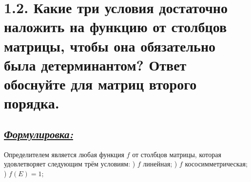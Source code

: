 \documentclass{article}
\begin{document}
\section*{\LARGE 1.2. Какие три условия достаточно наложить на функцию от столбцов матрицы, чтобы она обязательно была детерминантом? Ответ обоснуйте для матриц второго порядка. }
\subsection*{\Large \underline{\textit{Формулировка: }}}
Определителем является любая функция $f$ от столбцов матрицы, которая удовлетворяет следующим трём условиям:
) $f$ линейная;
) $f$ кососимметрическая;
) $f(E) = 1$;
\end{document}
